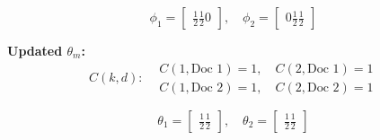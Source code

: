 \documentclass{article}
\begin{document}
\begin{enumerate}
	\[
	\phi_1 =
	\begin{bmatrix}
	\frac{1}{2} %
	\frac{1}{2} %
	0            %
	\end{bmatrix}, \quad
	\phi_2 =
	\begin{bmatrix}
	0             %
	\frac{1}{2}  %
	\frac{1}{2}  %
	\end{bmatrix}
	\]
	
	\textbf{Updated \( \theta_m \):}
	\[
	C(k, d):
	\begin{aligned}
	    &C(1, \text{Doc 1}) = 1, \quad C(2, \text{Doc 1}) = 1 \\
	    &C(1, \text{Doc 2}) = 1, \quad C(2, \text{Doc 2}) = 1
	\end{aligned}
	\]
	
	\[
	\theta_1 =
	\begin{bmatrix}
	\frac{1}{2}  %
	\frac{1}{2}  %
	\end{bmatrix}, \quad
	\theta_2 =
	\begin{bmatrix}
	\frac{1}{2}  %
	\frac{1}{2}  %
	\end{bmatrix}
	\]

\end{enumerate}
\end{document}
